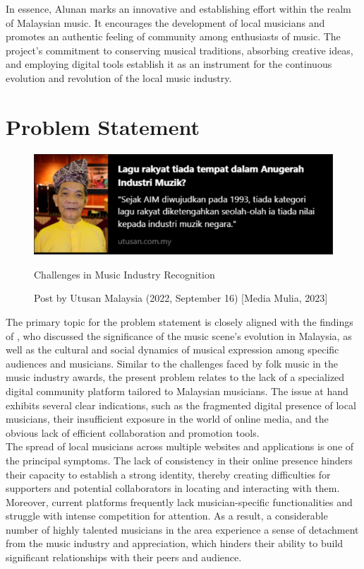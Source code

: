 In essence, Alunan marks an innovative and establishing effort within the realm of Malaysian music. It encourages the development of local musicians and promotes an authentic feeling of community among enthusiasts of music. The project's commitment to conserving musical traditions, absorbing creative ideas, and employing digital tools establish it as an instrument for the continuous evolution and revolution of the local music industry.

\section{Problem Statement}
\begin{figure}[h]
    \centering
    \includegraphics[width=0.6\linewidth]{mainmatter/images/probstate1.png}
    \caption{Challenges in Music Industry Recognition}
    \caption*{Post by Utusan Malaysia (2022, September 16) [Media Mulia, 2023]}
    \label{fig:myfig1}
\end{figure}
The primary topic for the problem statement is closely aligned with the findings of \textcite{silahudin19}, who discussed the significance of the music scene's evolution in Malaysia, as well as the cultural and social dynamics of musical expression among specific audiences and musicians. Similar to the challenges faced by folk music in the music industry awards, the present problem relates to the lack of a specialized digital community platform tailored to Malaysian musicians. The issue at hand exhibits several clear indications, such as the fragmented digital presence of local musicians, their insufficient exposure in the world of online media, and the obvious lack of efficient collaboration and promotion tools. \\

The spread of local musicians across multiple websites and applications is one of the principal symptoms. The lack of consistency in their online presence hinders their capacity to establish a strong identity, thereby creating difficulties for supporters and potential collaborators in locating and interacting with them. Moreover, current platforms frequently lack musician-specific functionalities and struggle with intense competition for attention. As a result, a considerable number of highly talented musicians in the area experience a sense of detachment from the music industry and appreciation, which hinders their ability to build significant relationships with their peers and audience. \\

